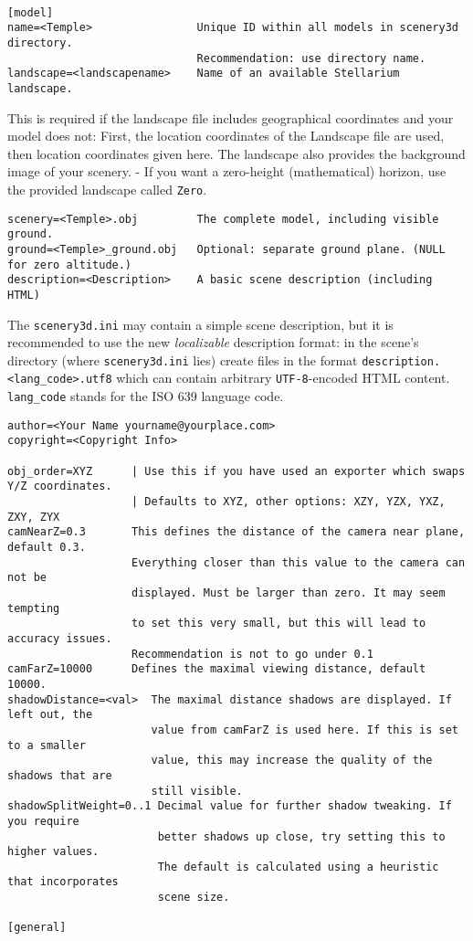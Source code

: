 \documentclass[a4paper]{article}
\newcommand{\filename}[1]{\texttt{#1}}
\newcommand{\cmd}[1]{\texttt{#1}}
\begin{document}
\begin{verbatim}

[model]
name=<Temple>                Unique ID within all models in scenery3d directory.
                             Recommendation: use directory name.
landscape=<landscapename>    Name of an available Stellarium landscape.
\end{verbatim}
This is required if the landscape file includes geographical
coordinates and your model does not: First, the location coordinates
of the Landscape file are used, then location coordinates given here.
The landscape also provides the background image of your scenery. - If
you want a zero-height (mathematical) horizon, use the provided
landscape called \filename{Zero}.
\begin{verbatim}
scenery=<Temple>.obj         The complete model, including visible ground.
ground=<Temple>_ground.obj   Optional: separate ground plane. (NULL for zero altitude.)
description=<Description>    A basic scene description (including HTML)
\end{verbatim}
The \filename{scenery3d.ini} may contain a simple scene description, but it is recommended to use the new \emph{localizable} description format: in the scene's directory (where \filename{scenery3d.ini} lies) create files in the format \filename{description.<lang\_code>.utf8} which can contain arbitrary \cmd{UTF-8}-encoded HTML content. \cmd{lang\_code} stands for the ISO 639 language code.
\begin{verbatim}
author=<Your Name yourname@yourplace.com>
copyright=<Copyright Info>

obj_order=XYZ      | Use this if you have used an exporter which swaps Y/Z coordinates.
                   | Defaults to XYZ, other options: XZY, YZX, YXZ, ZXY, ZYX
camNearZ=0.3       This defines the distance of the camera near plane, default 0.3.
                   Everything closer than this value to the camera can not be 
                   displayed. Must be larger than zero. It may seem tempting 
                   to set this very small, but this will lead to accuracy issues. 
                   Recommendation is not to go under 0.1
camFarZ=10000      Defines the maximal viewing distance, default 10000.
shadowDistance=<val>  The maximal distance shadows are displayed. If left out, the
                      value from camFarZ is used here. If this is set to a smaller
                      value, this may increase the quality of the shadows that are
                      still visible.
shadowSplitWeight=0..1 Decimal value for further shadow tweaking. If you require
                       better shadows up close, try setting this to higher values.
                       The default is calculated using a heuristic that incorporates
                       scene size.

[general]
\end{verbatim}
\end{document}
